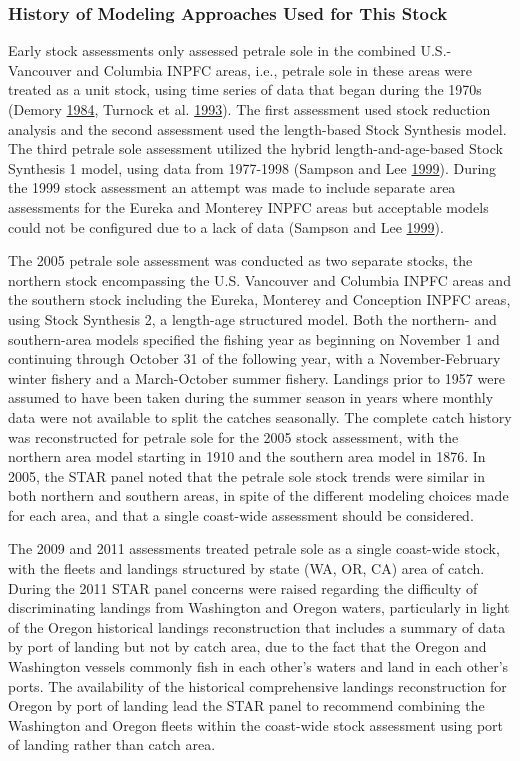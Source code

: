 \documentclass[12pt,]{article}
\begin{document}
\subsubsection{History of Modeling Approaches Used for This
Stock}\label{history-of-modeling-approaches-used-for-this-stock}

Early stock assessments only assessed petrale sole in the combined
U.S.-Vancouver and Columbia INPFC areas, i.e., petrale sole in these
areas were treated as a unit stock, using time series of data that began
during the 1970s (Demory
\protect\hyperlink{ref-demory_progress_1984}{1984}, Turnock et al.
\protect\hyperlink{ref-turnock_status_1993}{1993}). The first assessment
used stock reduction analysis and the second assessment used the
length-based Stock Synthesis model. The third petrale sole assessment
utilized the hybrid length-and-age-based Stock Synthesis 1 model, using
data from 1977-1998 (Sampson and Lee
\protect\hyperlink{ref-sampson_assessment_1999}{1999}). During the 1999
stock assessment an attempt was made to include separate area
assessments for the Eureka and Monterey INPFC areas but acceptable
models could not be configured due to a lack of data (Sampson and Lee
\protect\hyperlink{ref-sampson_assessment_1999}{1999}).

The 2005 petrale sole assessment was conducted as two separate stocks,
the northern stock encompassing the U.S. Vancouver and Columbia INPFC
areas and the southern stock including the Eureka, Monterey and
Conception INPFC areas, using Stock Synthesis 2, a length-age structured
model. Both the northern- and southern-area models specified the fishing
year as beginning on November 1 and continuing through October 31 of the
following year, with a November-February winter fishery and a
March-October summer fishery. Landings prior to 1957 were assumed to
have been taken during the summer season in years where monthly data
were not available to split the catches seasonally. The complete catch
history was reconstructed for petrale sole for the 2005 stock
assessment, with the northern area model starting in 1910 and the
southern area model in 1876. In 2005, the STAR panel noted that the
petrale sole stock trends were similar in both northern and southern
areas, in spite of the different modeling choices made for each area,
and that a single coast-wide assessment should be considered.

The 2009 and 2011 assessments treated petrale sole as a single
coast-wide stock, with the fleets and landings structured by state (WA,
OR, CA) area of catch. During the 2011 STAR panel concerns were raised
regarding the difficulty of discriminating landings from Washington and
Oregon waters, particularly in light of the Oregon historical landings
reconstruction that includes a summary of data by port of landing but
not by catch area, due to the fact that the Oregon and Washington
vessels commonly fish in each other's waters and land in each other's
ports. The availability of the historical comprehensive landings
reconstruction for Oregon by port of landing lead the STAR panel to
recommend combining the Washington and Oregon fleets within the
coast-wide stock assessment using port of landing rather than catch
area.
\end{document}
